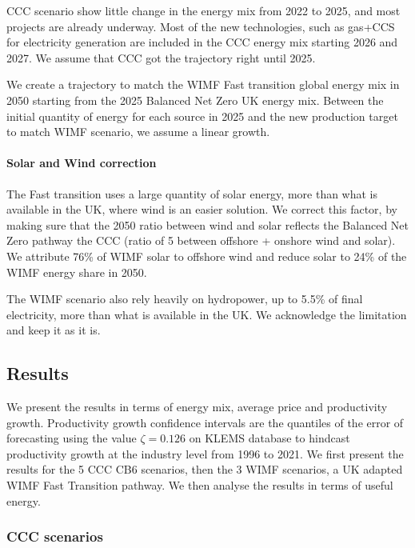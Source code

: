CCC scenario show little change in the energy mix from 2022 to 2025, and most projects are already underway. Most of the new technologies, such as gas+CCS for electricity generation are included in the CCC energy mix starting 2026 and 2027. We assume that CCC got the trajectory right until 2025. 

We create a trajectory to match the WIMF Fast transition global energy mix in 2050 starting from the 2025 Balanced Net Zero UK energy mix.
Between the initial quantity of energy for each source in 2025 and the new production target to match WIMF scenario, we assume a linear growth. 

\paragraph{Solar and Wind correction} 
The Fast transition uses a large quantity of solar energy, more than what is available in the UK, where wind is an easier solution. We correct this factor, by making sure that the 2050 ratio between wind and solar reflects the Balanced Net Zero pathway the CCC (ratio of 5 between offshore + onshore wind and solar). We attribute 76\% of WIMF solar to offshore wind and reduce solar to 24\% of the WIMF energy share in 2050. 

The WIMF scenario also rely heavily on hydropower, up to 5.5\% of final electricity, more than what is available in the UK. We acknowledge the limitation and keep it as it is.





\subsection{Results}
\label{app_energy_results}


We present the results in terms of energy mix, average price and productivity growth. Productivity growth confidence intervals are the quantiles of the error of forecasting using the value $\zeta=0.126$ on KLEMS database to hindcast productivity growth at the industry level from 1996 to 2021.
We first present the results for the 5 CCC CB6 scenarios, then the 3 WIMF scenarios, a UK adapted WIMF Fast Transition pathway. We then analyse the results in terms of useful energy.

\subsubsection{CCC scenarios}
\label{section_energy_ccc}

